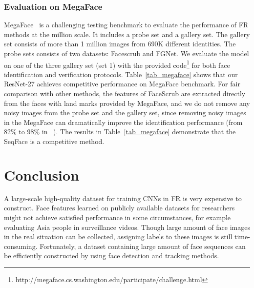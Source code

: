 \documentclass[conference]{acmsiggraph}
\begin{document}
\subsubsection{Evaluation on MegaFace} MegaFace~\cite{megaface} is a challenging testing benchmark to evaluate the performance of FR methods at the million scale. It includes a probe set and a gallery set. The gallery set consists of more than 1 million images from 690K different identities. The probe sets consists of two datasets: Facescrub and FGNet. We evaluate the model on one of the three gallery set (set 1) with the provided code\footnote{http://megaface.cs.washington.edu/participate/challenge.html} for both face identification and verification protocols. Table~\ref{tab_megaface} shows that our ResNet-27 achieves competitive performance on MegaFace benchmark. For fair comparison with other methods, the features of FaceScrub are extracted directly from the faces with land marks provided by MegaFace, and we do not remove any noisy images from the probe set and the gallery set, since removing noisy images in the MegaFace can dramatically improve the identification performance (from 82\% to 98\% in ~\cite{arcface}). The results in Table~\ref{tab_megaface} demonstrate that the SeqFace is a competitive method.

\begin{table*}[t]
\centering
{}
\label{tab_megaface}
\end{table*}
\fi
\section{Conclusion}
\label{sec:conclusion}
A large-scale high-quality dataset for training CNNs in FR is very expensive to construct. Face features learned on publicly available datasets for researchers might not achieve satisfied performance in some circumstances, for example evaluating Asia people in surveillance videos. Though large amount of face images in the real situation can be collected, assigning labels to these images is still time-consuming. Fortunately, a dataset containing large amount of face sequences can be efficiently constructed by using face detection and tracking methods.
\end{document}
